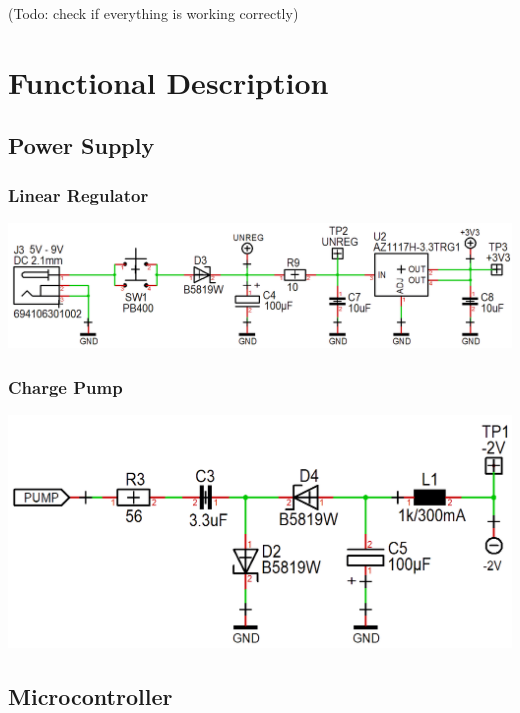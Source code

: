 \documentclass{scrartcl}
\begin{document}
(Todo: check if everything is working correctly)

\pagebreak


\section{Functional Description}

\subsection{Power Supply}

\subsubsection{Linear Regulator}

\begin{center}
    \includegraphics[scale=0.4]{assets/schema-power.png}
\end{center}

\subsubsection{Charge Pump}

\begin{center}
    \includegraphics[scale=0.3]{assets/schema-pump.png}
\end{center}

\subsection{Microcontroller}
\end{document}

